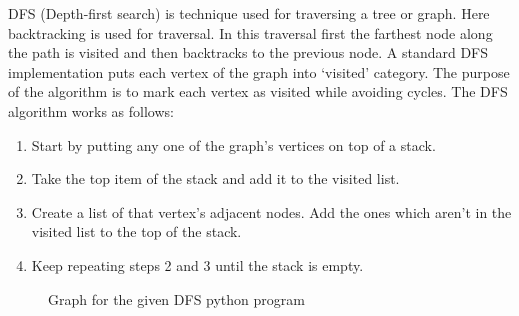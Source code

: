 \documentclass[a4paper,11pt]{book}
\begin{document}
\noindent DFS (Depth-first search) is technique used for traversing a tree or graph. Here backtracking is used for traversal. In this traversal first the farthest node along the path is visited and then backtracks to the previous node. A standard DFS implementation puts each vertex of the graph into `visited' category. The purpose of the algorithm is to mark each vertex as visited while avoiding cycles. The DFS algorithm works as follows:
\begin{enumerate}
    \item Start by putting any one of the graph's vertices on top of a stack.
    \item Take the top item of the stack and add it to the visited list.
    \item Create a list of that vertex's adjacent nodes. Add the ones which aren't in the visited list to the top of the stack.
    \item Keep repeating steps 2 and 3 until the stack is empty.
\end{enumerate}

\begin{figure}
    \centering
    \caption{Graph for the given DFS python program}
    \label{fig:graph_program}
\end{figure}
\end{document}
